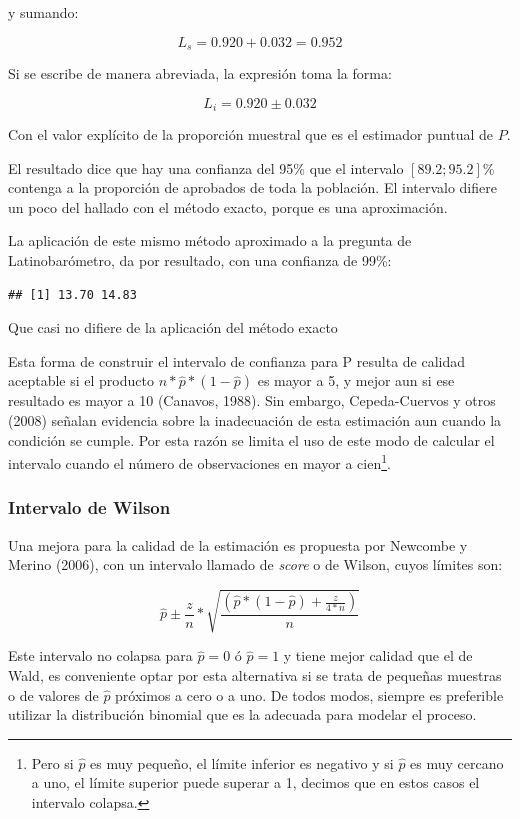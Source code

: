 \documentclass[]{book}
\let\rmarkdownfootnote\footnote%
\def\footnote{\protect\rmarkdownfootnote}
\begin{document}
y sumando:

\[L_{s} = 0.920 + 0.032 = 0.952\]

Si se escribe de manera abreviada, la expresión toma la forma:

\[L_{i} = 0.920 \pm 0.032\]

Con el valor explícito de la proporción muestral que es el estimador
puntual de \(P\).

El resultado dice que hay una confianza del 95\% que el intervalo \([89.2; 95.2]\)\% contenga a la proporción de aprobados de toda la población. El intervalo difiere un poco del hallado con el método exacto, porque es
una aproximación.

La aplicación de este mismo método aproximado a la pregunta de Latinobarómetro, da por resultado, con una confianza de 99\%:

\begin{verbatim}
## [1] 13.70 14.83
\end{verbatim}

Que casi no difiere de la aplicación del método exacto

Esta forma de construir el intervalo de confianza para P resulta de
calidad aceptable si el producto \(n*\widehat{p}*(1 - \widehat{p})\) es
mayor a 5, y mejor aun si ese resultado es mayor a 10 (Canavos, 1988).
Sin embargo, Cepeda-Cuervos y otros (2008) señalan evidencia sobre la
inadecuación de esta estimación aun cuando la condición se cumple. Por
esta razón se limita el uso de este modo de calcular el intervalo cuando el número de observaciones en mayor a cien\footnote{Pero si \(\widehat{p}\) es muy pequeño, el límite inferior es negativo y si \(\widehat{p}\) es muy cercano a uno, el límite superior puede superar a 1, decimos que en estos casos el intervalo colapsa.}.

\hypertarget{intervalo-de-wilson}{%
\subsubsection{Intervalo de Wilson}\label{intervalo-de-wilson}}

Una mejora para la calidad de la estimación es propuesta por Newcombe y
Merino (2006), con un intervalo llamado de \emph{score} o de Wilson, cuyos
límites son:

\[\widehat{p} \pm \frac{z}{n}*\sqrt{\frac{\left( \widehat{p}*\left( 1 - \widehat{p} \right) + \frac{z}{4*n} \right)}{n}}\]

Este intervalo no colapsa para \(\widehat{p} = 0\) ó \(\widehat{p} = 1\) y
tiene mejor calidad que el de Wald, es conveniente optar por esta
alternativa si se trata de pequeñas muestras o de valores de
\(\widehat{p}\) próximos a cero o a uno. De todos modos, siempre es
preferible utilizar la distribución binomial que es la adecuada para
modelar el proceso.
\end{document}
